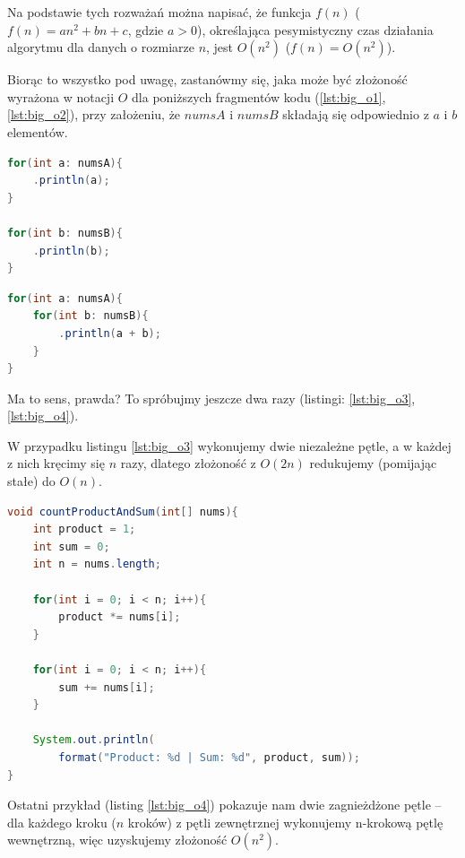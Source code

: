 \documentclass[twoside]{article}
\begin{document}
Na podstawie tych rozważań można napisać, że funkcja $f(n)$ ($f(n) = an^2 + bn + c$, gdzie $a > 0$), określająca
pesymistyczny czas działania algorytmu dla danych o rozmiarze $n$, jest $O(n^2)$ ($f(n)=O(n^2)$).

Biorąc to wszystko pod uwagę, zastanówmy się, jaka może być złożoność wyrażona w notacji $O$ dla poniższych 
fragmentów kodu (\ref{lst:big_o1}, \ref{lst:big_o2}), przy założeniu, że $numsA$ i $numsB$ składają się 
odpowiednio z $a$ i $b$ elementów.

\begin{minipage}[t]{.45\textwidth}
\begin{lstlisting}[caption={Złożoność $O(a+b)$.}, frame=tblr, language=Java, label={lst:big_o1}]
for(int a: numsA){
    .println(a);
}

for(int b: numsB){
    .println(b);
}
\end{lstlisting}
\end{minipage}
\hfill
\begin{minipage}[t]{.45\textwidth}
\begin{lstlisting}[caption={Złożoność $O(a*b)$.}, frame=tblr, language=Java, label={lst:big_o2}]
for(int a: numsA){
    for(int b: numsB){
        .println(a + b);
    }
}
\end{lstlisting}
\end{minipage}

Ma to sens, prawda?
To spróbujmy jeszcze dwa razy (listingi: \ref{lst:big_o3}, \ref{lst:big_o4}).

W przypadku listingu \ref{lst:big_o3} wykonujemy dwie niezależne pętle, a w każdej z nich kręcimy się $n$ razy,
dlatego złożoność z $O(2n)$ redukujemy (pomijając stałe) do $O(n)$.

\begin{lstlisting}[caption={Złożoność $O(n)$.}, frame=tblr, language=Java, label={lst:big_o3}]
void countProductAndSum(int[] nums){
    int product = 1;
    int sum = 0;
    int n = nums.length;
    
    for(int i = 0; i < n; i++){
        product *= nums[i];
    }
    
    for(int i = 0; i < n; i++){
        sum += nums[i];
    }
    
    System.out.println(
        format("Product: %d | Sum: %d", product, sum));
}
\end{lstlisting}

Ostatni przykład (listing \ref{lst:big_o4}) pokazuje nam dwie zagnieżdżone pętle -- dla każdego kroku ($n$ kroków)
z pętli zewnętrznej wykonujemy n-krokową pętlę wewnętrzną, więc uzyskujemy złożoność $O(n^2)$.
\end{document}
